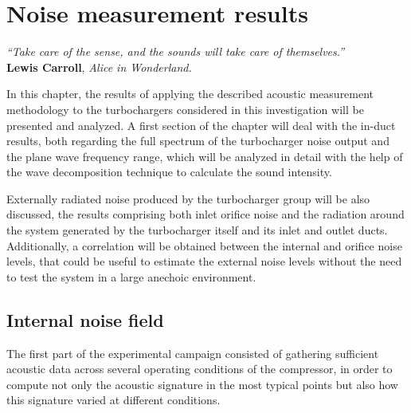 \chapter{Noise measurement results} \label{cap:results}

\null\vspace{-10mm}
\begin{flushright}
\begin{minipage}[t]{0.5\textwidth}
{\itshape\small``Take care of the sense, and the sounds will take care of themselves.''}\\[-3mm]

{\cabincondensed\small\hfill \textbf{Lewis Carroll}, \emph{Alice in Wonderland.}}\\[5mm]
\end{minipage}
\end{flushright}

\noindent In this chapter, the results of applying the described acoustic measurement methodology to the turbochargers considered in this investigation will be presented and analyzed. A first section of the chapter will deal with the in-duct results, both regarding the full spectrum of the turbocharger noise output and the plane wave frequency range, which will be analyzed in detail with the help of the wave decomposition technique to calculate the sound intensity.

Externally radiated noise produced by the turbocharger group will be also discussed, the results comprising both inlet orifice noise and the radiation around the system generated by the turbocharger itself and its inlet and outlet ducts. Additionally, a correlation will be obtained between the internal and orifice noise levels, that could be useful to estimate the external noise levels without the need to test the system in a large anechoic environment.

\section{Internal noise field}\label{sec:res_internal}

The first part of the experimental campaign consisted of gathering sufficient acoustic data across several operating conditions of the compressor, in order to compute not only the acoustic signature in the most typical points but also how this signature varied at different conditions.

